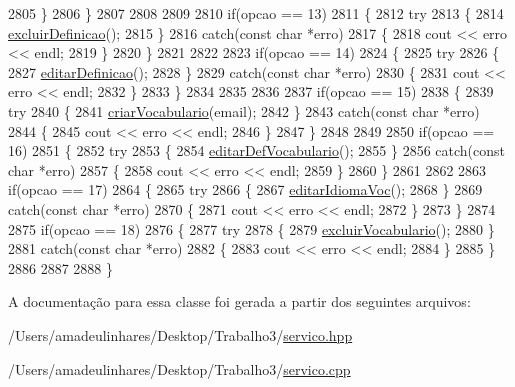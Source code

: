 \begin{DoxyCode}
2805     \}
2806   \}
2807 
2808 
2809 
2810   \textcolor{keywordflow}{if}(opcao == 13)
2811   \{
2812     \textcolor{keywordflow}{try}
2813     \{
2814       \mbox{\hyperlink{class_servico_usuarios_administrador_a1c78a37ca8e92725926d3f13299a50b6}{excluirDefinicao}}();
2815     \}
2816     \textcolor{keywordflow}{catch}(\textcolor{keyword}{const} \textcolor{keywordtype}{char} *erro)
2817     \{
2818       cout << erro << endl;
2819     \}
2820   \}
2821 
2822 
2823   \textcolor{keywordflow}{if}(opcao == 14)
2824   \{
2825     \textcolor{keywordflow}{try}
2826     \{
2827       \mbox{\hyperlink{class_servico_usuarios_administrador_aa1bda96596ffda5676af7181eaae9466}{editarDefinicao}}();
2828     \}
2829     \textcolor{keywordflow}{catch}(\textcolor{keyword}{const} \textcolor{keywordtype}{char} *erro)
2830     \{
2831       cout << erro << endl;
2832     \}
2833   \}
2834 
2835 
2836 
2837   \textcolor{keywordflow}{if}(opcao == 15)
2838   \{
2839     \textcolor{keywordflow}{try}
2840     \{
2841       \mbox{\hyperlink{class_servico_usuarios_administrador_a87f2dca2e2b3858f663b4220f357d26f}{criarVocabulario}}(email);
2842     \}
2843     \textcolor{keywordflow}{catch}(\textcolor{keyword}{const} \textcolor{keywordtype}{char} *erro)
2844     \{
2845       cout << erro << endl;
2846     \}
2847   \}
2848 
2849 
2850   \textcolor{keywordflow}{if}(opcao == 16)
2851   \{
2852     \textcolor{keywordflow}{try}
2853     \{
2854       \mbox{\hyperlink{class_servico_usuarios_administrador_a57d5f777ed99a006dc2db5cdb0f135b1}{editarDefVocabulario}}();
2855     \}
2856     \textcolor{keywordflow}{catch}(\textcolor{keyword}{const} \textcolor{keywordtype}{char} *erro)
2857     \{
2858       cout << erro << endl;
2859     \}
2860   \}
2861 
2862 
2863   \textcolor{keywordflow}{if}(opcao == 17)
2864   \{
2865     \textcolor{keywordflow}{try}
2866     \{
2867       \mbox{\hyperlink{class_servico_usuarios_administrador_ac0d400904b25cd30911a446bce66603a}{editarIdiomaVoc}}();
2868     \}
2869     \textcolor{keywordflow}{catch}(\textcolor{keyword}{const} \textcolor{keywordtype}{char} *erro)
2870     \{
2871       cout << erro << endl;
2872     \}
2873   \}
2874 
2875   \textcolor{keywordflow}{if}(opcao == 18)
2876   \{
2877     \textcolor{keywordflow}{try}
2878     \{
2879       \mbox{\hyperlink{class_servico_usuarios_administrador_a13237b760df88f3f8a825a5bcd1d7331}{excluirVocabulario}}();
2880     \}
2881     \textcolor{keywordflow}{catch}(\textcolor{keyword}{const} \textcolor{keywordtype}{char} *erro)
2882     \{
2883       cout << erro << endl;
2884     \}
2885   \}
2886 
2887 
2888 \}
\end{DoxyCode}


A documentação para essa classe foi gerada a partir dos seguintes arquivos\+:\begin{DoxyCompactItemize}
\item 
/\+Users/amadeulinhares/\+Desktop/\+Trabalho3/\mbox{\hyperlink{servico_8hpp}{servico.\+hpp}}\item 
/\+Users/amadeulinhares/\+Desktop/\+Trabalho3/\mbox{\hyperlink{servico_8cpp}{servico.\+cpp}}\end{DoxyCompactItemize}
